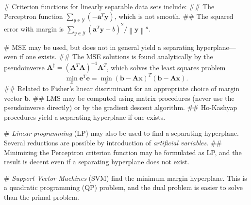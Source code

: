 \documentclass[12pt, a4paper]{article}
\newcommand{\Y}{\mathcal{Y}}
\newcommand{\vect}[1]{\bm{#1}}
\newcommand{\norm}[1]{\left\lVert#1\right\rVert}
\begin{document}
\begin{easylist}[itemize]
# Criterion functions for linearly separable data sets include:
## The Perceptron function $\sum_{y \in \Y} (-\vect{a}^T \vect{y})$, which is not smooth.
## The squared error with margin is $\sum_{y \in \Y} (\vect{a}^T \vect{y} - b)^2 / \norm{\vect{y}}^a$.

# MSE may be used, but does not in general yield a separating hyperplane---even if one exists.
## The MSE solutions is found analytically by the pseudoinverse $\vect{A}^\dagger = \left( \vect{A}^T \vect{A} \right)^{-1} \vect{A}^T$, which solves the least squares problem
\begin{equation*}
	\min_x \vect{e}^T\vect{e} = 
	\min_x \left(\vect{b} - \vect{A}\vect{x}\right)^T
	\left(\vect{b} - \vect{A}\vect{x}\right).
\end{equation*}
## Related to Fisher's linear discriminant for an appropriate choice of margin vector $\vect{b}$.
## LMS may be computed using matrix procedures (never use the pseudoinverse directly) or by the gradient descent algorithm.
## Ho-Kashyap procedures yield a separating hyperplane if one exists.

# \emph{Linear programming} (LP) may also be used to find a separating hyperplane. Several reductions are possible by introduction of \emph{artificial variables}.
## Minimizing the Perceptron criterion function may be formulated as LP, and the result is decent even if a separating hyperplane does not exist.

# \emph{Support Vector Machines} (SVM) find the minimum margin hyperplane.
This is a quadratic programming (QP) problem, and the dual problem is easier to solve than the primal problem.
\end{easylist}
\end{document}
